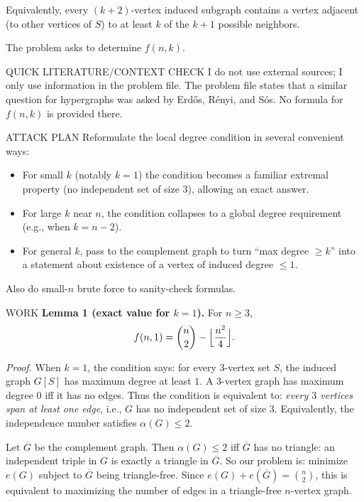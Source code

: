 Equivalently, every $(k+2)$-vertex induced subgraph contains a vertex adjacent
(to other vertices of $S$) to at least $k$ of the $k+1$ possible neighbors.

The problem asks to determine $f(n,k)$.

QUICK LITERATURE/CONTEXT CHECK
I do not use external sources; I only use information in the problem file.
The problem file states that a similar question for hypergraphs was asked by
Erd\H{o}s, R\'enyi, and S\'os.
No formula for $f(n,k)$ is provided there.

ATTACK PLAN
Reformulate the local degree condition in several convenient ways:
\begin{itemize}
\item For small $k$ (notably $k=1$) the condition becomes a familiar extremal
property (no independent set of size $3$), allowing an exact answer.
\item For large $k$ near $n$, the condition collapses to a global degree
requirement (e.g., when $k=n-2$).
\item For general $k$, pass to the complement graph to turn ``max degree $\ge k$''
into a statement about existence of a vertex of induced degree $\le1$.
\end{itemize}
Also do small-$n$ brute force to sanity-check formulas.

WORK
\textbf{Lemma 1 (exact value for $k=1$).}
For $n\ge 3$,
\[
 f(n,1)=\binom{n}{2}-\Bigl\lfloor\frac{n^2}{4}\Bigr\rfloor.
\]

\emph{Proof.}
When $k=1$, the condition says:
for every $3$-vertex set $S$, the induced graph $G[S]$ has maximum degree at
least $1$. A $3$-vertex graph has maximum degree $0$ iff it has no edges.
Thus the condition is equivalent to: \emph{every $3$ vertices span at least one
edge}, i.e., $G$ has no independent set of size $3$.
Equivalently, the independence number satisfies $\alpha(G)\le2$.

Let $\overline{G}$ be the complement graph. Then $\alpha(G)\le2$ iff
$\overline{G}$ has no triangle: an independent triple in $G$ is exactly a
triangle in $\overline{G}$.
So our problem is:
minimize $e(G)$ subject to $\overline{G}$ being triangle-free.
Since $e(G)+e(\overline{G})=\binom{n}{2}$, this is equivalent to maximizing the
number of edges in a triangle-free $n$-vertex graph.

